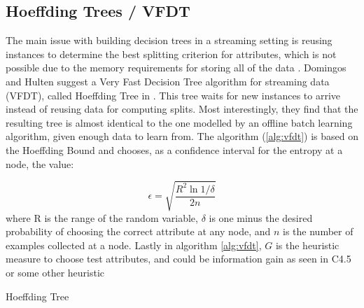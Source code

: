 \subsection{Hoeffding Trees / VFDT\label{section:vfdt}}
The main issue with building decision trees in a streaming setting is reusing instances to determine the best splitting criterion for attributes, which is not possible due to the memory requirements for storing all of the data \cite{domingos2000mining}. Domingos and Hulten suggest a Very Fast Decision Tree algorithm for streaming data (VFDT), called Hoeffding Tree in \cite{domingos2000mining}. This tree waits for new instances to arrive instead of reusing data for computing splits. Most interestingly, they find that the resulting tree is almost identical to the one modelled by an offline batch learning algorithm, given enough data to learn from. The algorithm (\ref{alg:vfdt}) is based on the Hoeffding Bound and chooses, as a confidence interval for the entropy at a node, the value:

\begin{equation}
\epsilon=\sqrt{\frac{R^{2} \ln 1 / \delta}{2 n}}
\end{equation}
where R is the range of the random variable, $\delta$ is one minus the desired probability of choosing the correct attribute at any node, and $n$ is the number of examples collected at a node. Lastly in algorithm \ref{alg:vfdt}, $G$ is the heuristic measure to choose test attributes, and could be information gain as seen in C4.5 or some other heuristic \cite{bifet2018machine, domingos2000mining, }

\begin{algorithm}
\caption{Hoeffding Tree\label{alg:vfdt} \cite{bifet2018machine}}
\setcounter{AlgoLine}{0}
\end{algorithm}

